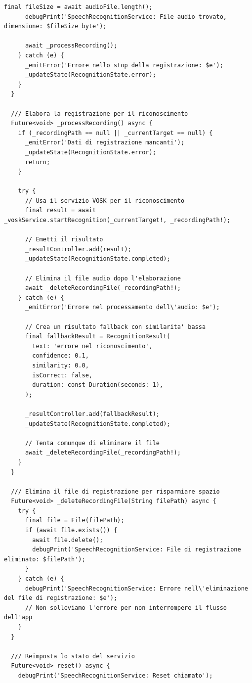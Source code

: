 \documentclass[14pt]{extbook}
\begin{document}
\begin{lstlisting}[caption=speech\_recognition\_service.dart, label=lst:SpeechRecognitionService]
      final fileSize = await audioFile.length();
      debugPrint('SpeechRecognitionService: File audio trovato, dimensione: $fileSize byte');

      await _processRecording();
    } catch (e) {
      _emitError('Errore nello stop della registrazione: $e');
      _updateState(RecognitionState.error);
    }
  }

  /// Elabora la registrazione per il riconoscimento
  Future<void> _processRecording() async {
    if (_recordingPath == null || _currentTarget == null) {
      _emitError('Dati di registrazione mancanti');
      _updateState(RecognitionState.error);
      return;
    }

    try {
      // Usa il servizio VOSK per il riconoscimento
      final result = await _voskService.startRecognition(_currentTarget!, _recordingPath!);

      // Emetti il risultato
      _resultController.add(result);
      _updateState(RecognitionState.completed);

      // Elimina il file audio dopo l'elaborazione
      await _deleteRecordingFile(_recordingPath!);
    } catch (e) {
      _emitError('Errore nel processamento dell\'audio: $e');

      // Crea un risultato fallback con similarita' bassa
      final fallbackResult = RecognitionResult(
        text: 'errore nel riconoscimento',
        confidence: 0.1,
        similarity: 0.0,
        isCorrect: false,
        duration: const Duration(seconds: 1),
      );

      _resultController.add(fallbackResult);
      _updateState(RecognitionState.completed);

      // Tenta comunque di eliminare il file
      await _deleteRecordingFile(_recordingPath!);
    }
  }

  /// Elimina il file di registrazione per risparmiare spazio
  Future<void> _deleteRecordingFile(String filePath) async {
    try {
      final file = File(filePath);
      if (await file.exists()) {
        await file.delete();
        debugPrint('SpeechRecognitionService: File di registrazione eliminato: $filePath');
      }
    } catch (e) {
      debugPrint('SpeechRecognitionService: Errore nell\'eliminazione del file di registrazione: $e');
      // Non solleviamo l'errore per non interrompere il flusso dell'app
    }
  }

  /// Reimposta lo stato del servizio
  Future<void> reset() async {
    debugPrint('SpeechRecognitionService: Reset chiamato');


\end{lstlisting}
\end{document}
